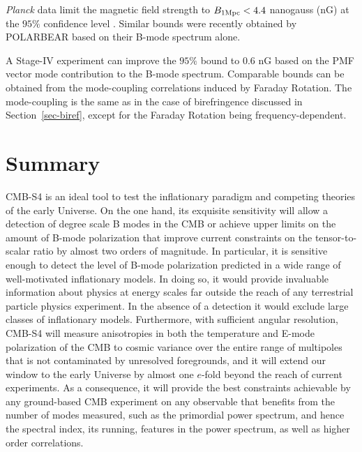 {\it Planck\/} data limit the magnetic field strength to $B_{1 {\rm Mpc}}<4.4$ nanogauss (nG) at the $95\%$ confidence level \cite{Ade:2015cva}. Similar bounds were recently obtained by POLARBEAR \cite{Ade:2015cao} based on their B-mode spectrum alone.

A Stage-IV experiment can improve the $95\%$ bound to 0.6 nG based on the PMF vector mode contribution to the B-mode spectrum. Comparable bounds can be obtained from the mode-coupling correlations induced by Faraday Rotation. The mode-coupling is the same as in the case of birefringence discussed in Section~\ref{sec-biref}, except for the Faraday Rotation being frequency-dependent.

 
\section{Summary}
CMB-S4 is an ideal tool to test the inflationary paradigm and competing theories of the early Universe. On the one hand, its exquisite sensitivity will allow a detection of degree scale B modes in the CMB or achieve upper limits on the amount of B-mode polarization that improve current constraints on the tensor-to-scalar ratio by almost two orders of magnitude. In particular, it is sensitive enough to detect the level of B-mode polarization predicted in a wide range of well-motivated inflationary models. In doing so, it would provide invaluable information about physics at energy scales far outside the reach of any terrestrial particle physics experiment. In the absence of a detection it would exclude large classes of inflationary models. Furthermore, with sufficient angular resolution, CMB-S4 will measure anisotropies in both the temperature and E-mode polarization of the CMB to cosmic variance over the entire range of multipoles that is not contaminated by unresolved foregrounds, and it will extend our window to the early Universe by almost one $e$-fold beyond the reach of current experiments. As a consequence, it will provide the best constraints achievable by any ground-based CMB experiment on any observable that benefits from the number of modes measured, such as the primordial power spectrum, and hence the spectral index, its running, features in the power spectrum, as well as higher order correlations.


 
